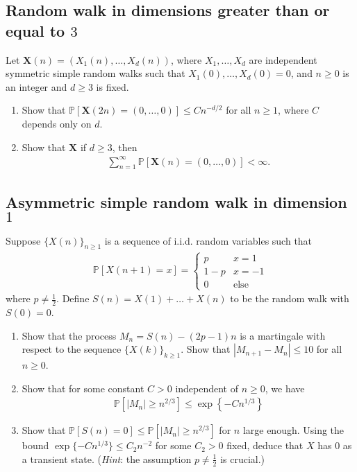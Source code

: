 \documentclass[12pt,reqno]{amsart}
\theoremstyle{definition}
\theoremstyle{remark}
\numberwithin{equation}{section}
\begin{document}
\subsection{Random walk in dimensions greater than or equal to $3$}
Let $\mathbf{X}(n)=(X_{1}(n),\ldots,X_{d}(n))$, where $X_{1},\ldots,X_{d}$ are independent symmetric simple random walks such that $X_{1}(0),\ldots,X_{d}(0)=0$, and $n\geq0$ is an integer and $d\geq3$ is fixed.
\begin{enumerate}
\item Show that $\mathbb{P}[\mathbf{X}(2n)=(0,\ldots,0)]\leq Cn^{-d/2}$ for all $n\geq1$, where $C$ depends only on $d$.
\item Show that $\mathbf{X}$ if $d\geq3$, then 
%
\begin{align*}
\sum_{n=1}^{\infty}\mathbb{P}[\mathbf{X}(n)=(0,\ldots,0)]<\infty.
\end{align*}
%
\end{enumerate}
\subsection{Asymmetric simple random walk in dimension $1$}
Suppose $\{X(n)\}_{n\geq1}$ is a sequence of i.i.d. random variables such that 
%
\begin{align*}
\mathbb{P}[X(n+1)=x]=\begin{cases}p&x=1\\1-p&x=-1\\0&\mathrm{else}\end{cases}
\end{align*}
%
where $p\neq\frac12$. Define $S(n)=X(1)+\ldots+X(n)$ to be the random walk with $S(0)=0$.
\begin{enumerate}
\item Show that the process $M_{n}=S(n)-(2p-1)n$ is a martingale with respect to the sequence $\{X(k)\}_{k\geq1}$. Show that $|M_{n+1}-M_{n}|\leq 10$ for all $n\geq0$.
\item Show that for some constant $C>0$ independent of $n\geq0$, we have
%
\begin{align*}
\mathbb{P}\left[|M_{n}|\geq n^{2/3}\right]\leq \exp\left\{-Cn^{1/3}\right\}
\end{align*}
%
\item Show that $\mathbb{P}[S(n)=0]\leq\mathbb{P}[|M_{n}|\geq n^{2/3}]$ for $n$ large enough. Using the bound $\exp\{-Cn^{1/3}\}\leq C_{2}n^{-2}$ for some $C_{2}>0$ fixed, deduce that $X$ has $0$ as a transient state. (\emph{Hint}: the assumption $p\neq\frac12$ is crucial.)
\end{enumerate}
\end{document}
